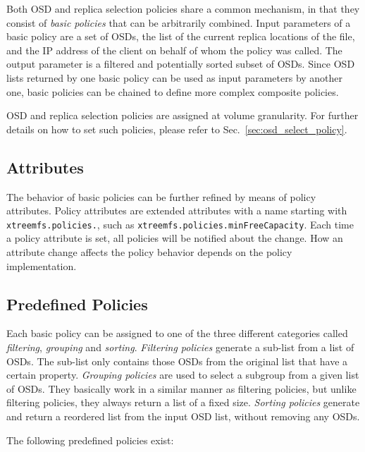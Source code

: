 \documentclass[a4paper,10pt]{book}
\begin{document}
Both OSD and replica selection policies share a common mechanism, in that they consist of \emph{basic policies} that can be arbitrarily combined. Input parameters of a basic policy are a set of OSDs, the list of the current replica locations of the file, and the IP address of the client on behalf of whom the policy was called. The output parameter is a filtered and potentially sorted subset of OSDs. Since OSD lists returned by one basic policy can be used as input parameters by another one, basic policies can be chained to define more complex composite policies.

OSD and replica selection policies are assigned at volume granularity. For further details on how to set such policies, please refer to Sec.\ \ref{sec:osd_select_policy}.

\subsection{Attributes}

The behavior of basic policies can be further refined by means of policy attributes. Policy attributes are extended attributes with a name starting with \texttt{xtreemfs.policies.}, such as \texttt{xtreemfs.policies.minFreeCapacity}. Each time a policy attribute is set, all policies will be notified about the change. How an attribute change affects the policy behavior depends on the policy implementation.

\subsection{Predefined Policies}
\label{sec:predefinedPolicies}

Each basic policy can be assigned to one of the three different categories called \emph{filtering}, \emph{grouping} and \emph{sorting}. \emph{Filtering policies} generate a sub-list from a list of OSDs. The sub-list only contains those OSDs from the original list that have a certain property. \emph{Grouping policies} are used to select a subgroup from a given list of OSDs. They basically work in a similar manner as filtering policies, but unlike filtering policies, they always return a list of a fixed size. \emph{Sorting policies} generate and return a reordered list from the input OSD list, without removing any OSDs.

The following predefined policies exist:
\end{document}

